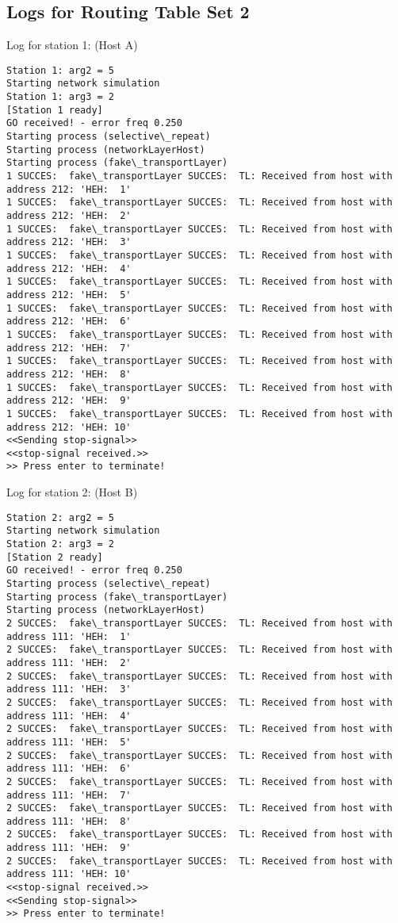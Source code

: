 \subsection{Logs for Routing Table Set 2}
Log for station 1: (Host A)
\begin{lstlisting}[breaklines=true]
Station 1: arg2 = 5
Starting network simulation
Station 1: arg3 = 2
[Station 1 ready]
GO received! - error freq 0.250
Starting process (selective\_repeat)
Starting process (networkLayerHost)
Starting process (fake\_transportLayer)
1 SUCCES:  fake\_transportLayer SUCCES:  TL: Received from host with address 212: 'HEH:  1'
1 SUCCES:  fake\_transportLayer SUCCES:  TL: Received from host with address 212: 'HEH:  2'
1 SUCCES:  fake\_transportLayer SUCCES:  TL: Received from host with address 212: 'HEH:  3'
1 SUCCES:  fake\_transportLayer SUCCES:  TL: Received from host with address 212: 'HEH:  4'
1 SUCCES:  fake\_transportLayer SUCCES:  TL: Received from host with address 212: 'HEH:  5'
1 SUCCES:  fake\_transportLayer SUCCES:  TL: Received from host with address 212: 'HEH:  6'
1 SUCCES:  fake\_transportLayer SUCCES:  TL: Received from host with address 212: 'HEH:  7'
1 SUCCES:  fake\_transportLayer SUCCES:  TL: Received from host with address 212: 'HEH:  8'
1 SUCCES:  fake\_transportLayer SUCCES:  TL: Received from host with address 212: 'HEH:  9'
1 SUCCES:  fake\_transportLayer SUCCES:  TL: Received from host with address 212: 'HEH: 10'
<<Sending stop-signal>>
<<stop-signal received.>>
>> Press enter to terminate!
\end{lstlisting}

Log for station 2: (Host B)
\begin{lstlisting}[breaklines=true]
Station 2: arg2 = 5
Starting network simulation
Station 2: arg3 = 2
[Station 2 ready]
GO received! - error freq 0.250
Starting process (selective\_repeat)
Starting process (fake\_transportLayer)
Starting process (networkLayerHost)
2 SUCCES:  fake\_transportLayer SUCCES:  TL: Received from host with address 111: 'HEH:  1'
2 SUCCES:  fake\_transportLayer SUCCES:  TL: Received from host with address 111: 'HEH:  2'
2 SUCCES:  fake\_transportLayer SUCCES:  TL: Received from host with address 111: 'HEH:  3'
2 SUCCES:  fake\_transportLayer SUCCES:  TL: Received from host with address 111: 'HEH:  4'
2 SUCCES:  fake\_transportLayer SUCCES:  TL: Received from host with address 111: 'HEH:  5'
2 SUCCES:  fake\_transportLayer SUCCES:  TL: Received from host with address 111: 'HEH:  6'
2 SUCCES:  fake\_transportLayer SUCCES:  TL: Received from host with address 111: 'HEH:  7'
2 SUCCES:  fake\_transportLayer SUCCES:  TL: Received from host with address 111: 'HEH:  8'
2 SUCCES:  fake\_transportLayer SUCCES:  TL: Received from host with address 111: 'HEH:  9'
2 SUCCES:  fake\_transportLayer SUCCES:  TL: Received from host with address 111: 'HEH: 10'
<<stop-signal received.>>
<<Sending stop-signal>>
>> Press enter to terminate!
\end{lstlisting}


